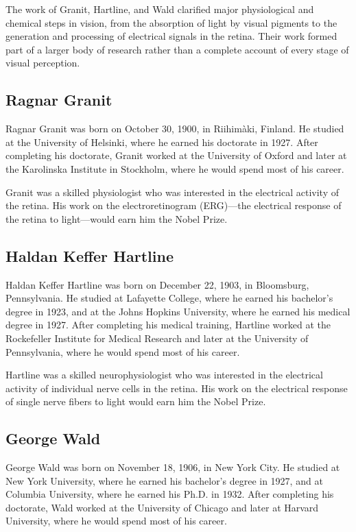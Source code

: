 The work of Granit, Hartline, and Wald clarified major physiological and chemical steps in vision, from the absorption of light by visual pigments to the generation and processing of electrical signals in the retina. Their work formed part of a larger body of research rather than a complete account of every stage of visual perception.

\subsection{Ragnar Granit}

Ragnar Granit was born on October 30, 1900, in Riihim\`{a}ki, Finland. He studied at the University of Helsinki, where he earned his doctorate in 1927. After completing his doctorate, Granit worked at the University of Oxford and later at the Karolinska Institute in Stockholm, where he would spend most of his career.

Granit was a skilled physiologist who was interested in the electrical activity of the retina. His work on the electroretinogram (ERG)---the electrical response of the retina to light---would earn him the Nobel Prize.

\subsection{Haldan Keffer Hartline}

Haldan Keffer Hartline was born on December 22, 1903, in Bloomsburg, Pennsylvania. He studied at Lafayette College, where he earned his bachelor's degree in 1923, and at the Johns Hopkins University, where he earned his medical degree in 1927. After completing his medical training, Hartline worked at the Rockefeller Institute for Medical Research and later at the University of Pennsylvania, where he would spend most of his career.

Hartline was a skilled neurophysiologist who was interested in the electrical activity of individual nerve cells in the retina. His work on the electrical response of single nerve fibers to light would earn him the Nobel Prize.

\subsection{George Wald}

George Wald was born on November 18, 1906, in New York City. He studied at New York University, where he earned his bachelor's degree in 1927, and at Columbia University, where he earned his Ph.D. in 1932. After completing his doctorate, Wald worked at the University of Chicago and later at Harvard University, where he would spend most of his career.

